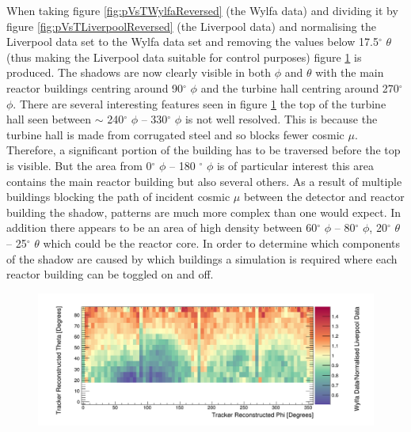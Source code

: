 When taking figure \ref{fig:pVsTWylfaReversed} (the Wylfa data) and dividing it by figure \ref{fig:pVsTLiverpoolReversed} (the Liverpool data) and normalising the Liverpool data set to the Wylfa data set and removing the values below 17.5$^\circ$ $\theta$ (thus making the Liverpool data suitable for control purposes) figure \ref{fig:measuredTrackerReconNoLines} is produced. The shadows are now clearly visible in both $\phi$ and $\theta$ with the main reactor buildings centring around 90$^\circ$ $\phi$ and the turbine hall centring around 270$^\circ$ $\phi$. There are several interesting features seen in figure \ref{fig:measuredTrackerReconNoLines} the top of the turbine hall seen between $\sim$ 240$^\circ$ $\phi$ -- 330$^\circ$ $\phi$ is not well resolved. This is because the turbine hall is made from corrugated steel and so blocks fewer cosmic $\mu$. Therefore, a significant portion of the building has to be traversed before the top is visible. But the area from 0$^\circ$ $\phi$ -- 180 $^\circ$ $\phi$ is of particular interest this area contains the main reactor building but also several others. As a result of multiple buildings blocking the path of incident cosmic $\mu$ between the detector and reactor building the shadow, patterns are much more complex than one would expect. In addition there appears to be an area of high density between 60$^\circ$ $\phi$ -- 80$^\circ$ $\phi$, 20$^\circ$ $\theta$ -- 25$^\circ$ $\theta$ which could be the reactor core. In order to determine which components of the shadow are caused by which buildings a simulation is required where each reactor building can be toggled on and off.

\begin{figure}[!h]
 \centering
 \includegraphics[width=\linewidth]{Chapter5/Figs/wylfaRasterNew/measuredTrackerReconNoLines.png}
 \label{fig:measuredTrackerReconNoLines}
\end{figure}

